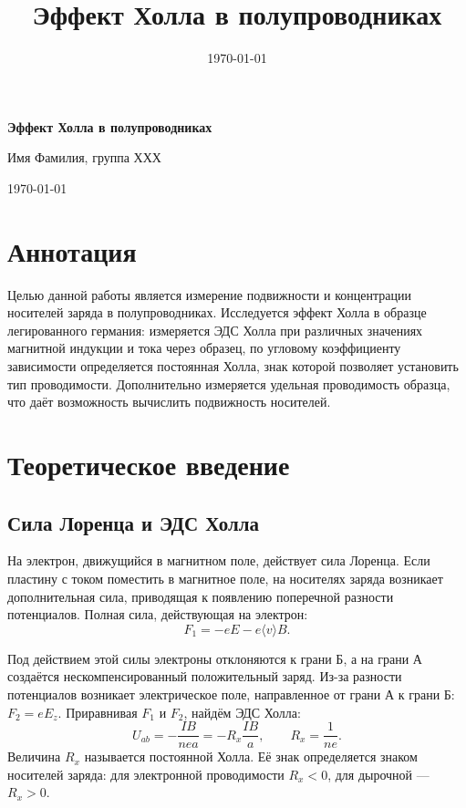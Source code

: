 \documentclass[a4paper,12pt]{article}
\title{Эффект Холла в полупроводниках}
\author{}
\date{\today}
\begin{document}
\begin{center}
    {\Large\bfseries Эффект Холла в полупроводниках\par}
    \vspace{0.4cm}
    {\large Имя Фамилия, группа ХХХ\par}
    \vspace{0.2cm}
    {\large \today\par}
\end{center}

\vspace{0.5cm}

\section{Аннотация}
Целью данной работы является измерение подвижности и концентрации носителей заряда в полупроводниках. Исследуется эффект Холла в образце легированного германия: измеряется ЭДС Холла при различных значениях магнитной индукции и тока через образец, по угловому коэффициенту зависимости определяется постоянная Холла, знак которой позволяет установить тип проводимости. Дополнительно измеряется удельная проводимость образца, что даёт возможность вычислить подвижность носителей.

\section{Теоретическое введение}

\subsection{Сила Лоренца и ЭДС Холла}
На электрон, движущийся в магнитном поле, действует сила Лоренца. Если пластину с током поместить в магнитное поле, на носителях заряда возникает дополнительная сила, приводящая к появлению поперечной разности потенциалов. Полная сила, действующая на электрон:
\begin{equation}
    F_1 = -eE - e\langle v \rangle B .
\end{equation}

Под действием этой силы электроны отклоняются к грани Б, а на грани А создаётся нескомпенсированный положительный заряд. Из-за разности потенциалов возникает электрическое поле, направленное от грани А к грани Б: $F_2 = eE_z$. Приравнивая $F_1$ и $F_2$, найдём ЭДС Холла:
\begin{equation}
    U_{ab} = -\frac{IB}{nea} = -R_x \frac{IB}{a},
    \qquad R_x = \frac{1}{ne}.
\end{equation}
Величина $R_x$ называется постоянной Холла. Её знак определяется знаком носителей заряда: для электронной проводимости $R_x < 0$, для дырочной — $R_x > 0$.
\end{document}
